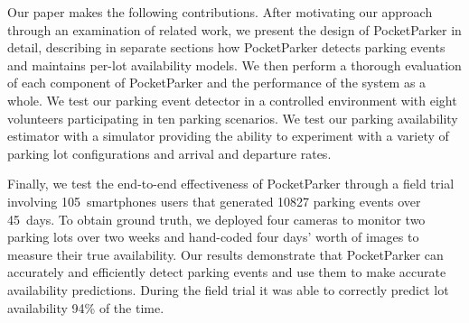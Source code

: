 Our paper makes the following contributions. After motivating our approach
through an examination of related work, we present the design of PocketParker
in detail, describing in separate sections how PocketParker detects parking
events and maintains per-lot availability models. We then perform a thorough
evaluation of each component of PocketParker and the performance of the
system as a whole. We test our parking event detector in a controlled
environment with eight volunteers participating in ten parking scenarios. We
test our parking availability estimator with a simulator providing the
ability to experiment with a variety of parking lot configurations and
arrival and departure rates.

Finally, we test the end-to-end effectiveness of PocketParker through a field
trial involving 105~smartphones users that generated \num{10827} parking
events over 45~days. To obtain ground truth, we deployed four cameras to
monitor two parking lots over two weeks and hand-coded four days' worth of
images to measure their true availability. Our results demonstrate that
PocketParker can accurately and efficiently detect parking events and use
them to make accurate availability predictions. During the field trial it was
able to correctly predict lot availability 94\% of the time.
